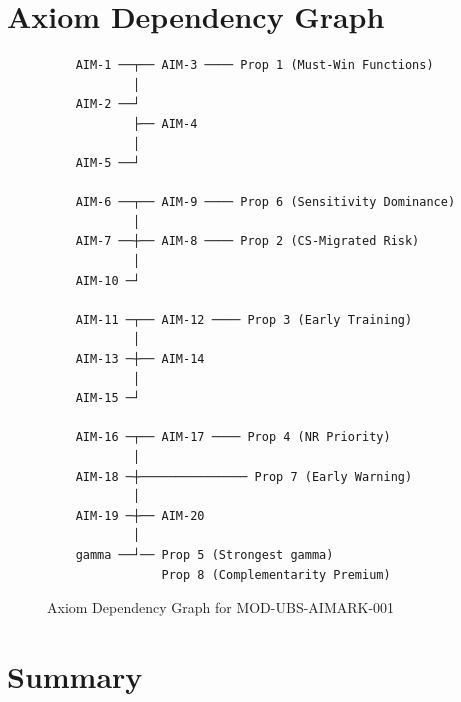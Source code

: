 \section{Axiom Dependency Graph}
\label{sec:aim-dependency}

\begin{figure}[htbp]
\centering
\begin{verbatim}
    AIM-1 ──┬── AIM-3 ──── Prop 1 (Must-Win Functions)
            │
    AIM-2 ──┘
            ├── AIM-4
            │
    AIM-5 ──┘

    AIM-6 ──┬── AIM-9 ──── Prop 6 (Sensitivity Dominance)
            │
    AIM-7 ──┼── AIM-8 ──── Prop 2 (CS-Migrated Risk)
            │
    AIM-10 ─┘

    AIM-11 ─┬── AIM-12 ──── Prop 3 (Early Training)
            │
    AIM-13 ─┼── AIM-14
            │
    AIM-15 ─┘

    AIM-16 ─┬── AIM-17 ──── Prop 4 (NR Priority)
            │
    AIM-18 ─┼─────────────── Prop 7 (Early Warning)
            │
    AIM-19 ─┼── AIM-20
            │
    gamma ──┘── Prop 5 (Strongest gamma)
                Prop 8 (Complementarity Premium)
\end{verbatim}
\caption{Axiom Dependency Graph for MOD-UBS-AIMARK-001}
\label{fig:aim-dependency}
\end{figure}


\section{Summary}
\label{sec:aim-summary}

